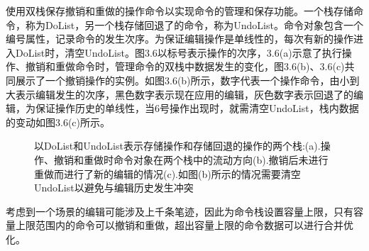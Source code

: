 使用双栈保存撤销和重做的操作命令以实现命令的管理和保存功能。一个栈存储命令，称为DoList，另一个栈存储回退了的命令，称为UndoList。命令对象包含一个编号属性，记录命令的发生次序。为保证编辑操作是单线性的，每次有新的操作进入DoList时，清空UndoList。图3.6以标号表示操作的次序，3.6(a)示意了执行操作、撤销和重做命令时，管理命令的双栈中数据发生的变化，图3.6(b)、3.6(c)共同展示了一个撤销操作的实例。如图3.6(b)所示，数字代表一个操作命令，由小到大表示编辑发生的次序，黑色数字表示现在应用的编辑，灰色数字表示回退了的编辑，为保证操作历史的单线性，当6号操作出现时，就需清空UndoList，栈内数据的变动如图3.6(c)所示。\begin{figure}[htbp]
    \centering

    \caption{以DoList和UndoList表示存储操作和存储回退的操作的两个栈:(a).操作、撤销和重做时命令对象在两个栈中的流动方向(b).撤销后未进行重做而进行了新的编辑的情况(c).如图(b)所示的情况需要清空UndoList以避免与编辑历史发生冲突}%
\end{figure}
考虑到一个场景的编辑可能涉及上千条笔迹，因此为命令栈设置容量上限，只有容量上限范围内的命令可以撤销和重做，超出容量上限的命令数据可以进行合并优化。
